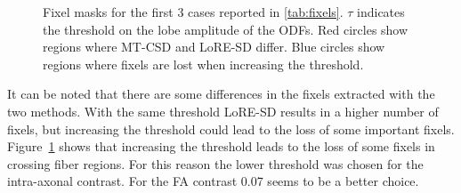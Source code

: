 \begin{figure}[H]
  \centering
  \hfill
  \hfill
  \caption[Fixel masks]{Fixel masks for the first 3 cases reported in \cref{tab:fixels}. $\tau$ indicates the threshold on the lobe amplitude of the ODFs. Red circles show regions where MT-CSD and LoRE-SD differ. Blue circles show regions where fixels are lost when increasing the threshold.}
  \label{fig:fixels}
\end{figure}



It can be noted that there are some differences in the fixels extracted with the two methods. With the same threshold LoRE-SD results in a higher number of fixels, but increasing the threshold could lead to the loss of some important fixels. Figure~\ref{fig:fixels} shows that increasing the threshold leads to the loss of some fixels in crossing fiber regions. For this reason the lower threshold was chosen for the intra-axonal contrast. For the FA contrast 0.07 seems to be a better choice.


